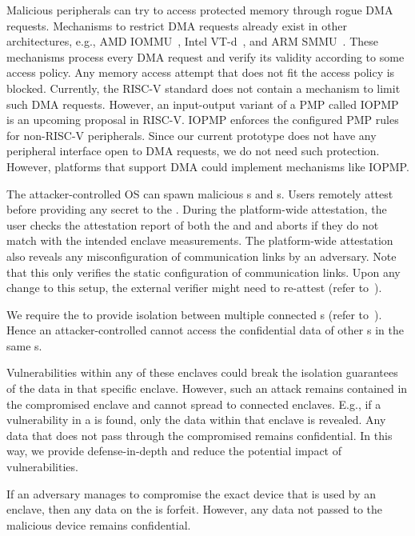 Malicious peripherals can try to access protected memory through rogue DMA requests. 
Mechanisms to restrict DMA requests already exist in other architectures, e.g., AMD IOMMU~\cite{amd2007iommu}, Intel VT-d~\cite{abramson2006vtd}, and ARM SMMU~\cite{arm2013smmu}. These mechanisms process every DMA request and verify its validity according to some access policy. Any memory access attempt that does not fit the access policy is blocked. Currently, the RISC-V standard does not contain a mechanism to limit such DMA requests. However, an input-output variant of a PMP called IOPMP~\cite{IOPMP} is an upcoming proposal in RISC-V. IOPMP enforces the configured PMP rules for non-RISC-V peripherals. Since our current prototype does not have any peripheral interface open to DMA requests, we do not need such protection. However, platforms that support DMA could implement mechanisms like IOPMP.

The attacker-controlled OS can spawn malicious \app{}s and \ce{}s. Users remotely attest before providing any secret to the \app. During the platform-wide attestation, the user checks the attestation report of both the \app and \ce and aborts if they do not match with the intended enclave measurements. The platform-wide attestation also reveals any misconfiguration of communication links by an adversary. Note that this only verifies the static configuration of communication links. Upon any change to this setup, the external verifier might need to re-attest (refer to~). 

We require the \ce{} to provide isolation between multiple connected \app{}s (refer to~). Hence an attacker-controlled \app cannot access the confidential data of other \app{}s in the same \ce{}s.

Vulnerabilities within any of these enclaves could break the isolation guarantees of the data in that specific enclave. However, such an attack remains contained in the compromised enclave and cannot spread to connected enclaves. E.g., if a vulnerability in a \ce{} is found, only the data within that enclave is revealed. Any data that does not pass through the compromised \ce remains confidential. In this way, we provide defense-in-depth and reduce the potential impact of vulnerabilities.

If an adversary manages to compromise the exact device that is used by an enclave, then any data on the \sphw is forfeit. However, any data not passed to the malicious device remains confidential.

